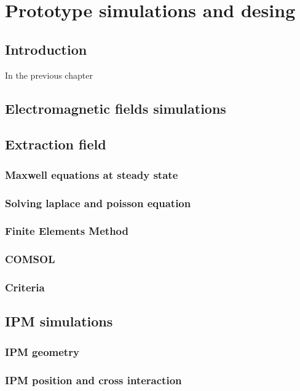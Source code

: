 \chapter{Prototype simulations and desing}
\cleardoublepage

\minitoc

\section{Introduction}
\begin{refsection}
  \label{ch3:Introduction}
  In the previous chapter 

	\section{Electromagnetic fields simulations}

	\section{Extraction field}
	\subsection{Maxwell equations at steady state}
	\subsection{Solving laplace and poisson equation}
	\subsection{Finite Elements Method}
	\subsection{COMSOL}
	\subsection{Criteria}
	\section{IPM simulations}
	\subsection{IPM geometry}
	\subsection{IPM position and cross interaction}

\end{refsection}
